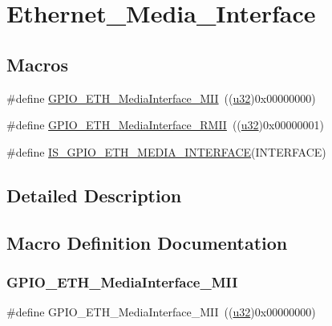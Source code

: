 \hypertarget{group___ethernet___media___interface}{}\section{Ethernet\+\_\+\+Media\+\_\+\+Interface}
\label{group___ethernet___media___interface}
\subsection*{Macros}
\begin{DoxyCompactItemize}
\item 
\#define \mbox{\hyperlink{group___ethernet___media___interface_gae11ff25c61c4f22f55118f9f88f6d465}{G\+P\+I\+O\+\_\+\+E\+T\+H\+\_\+\+Media\+Interface\+\_\+\+M\+II}}~((\mbox{\hyperlink{group___exported__types_gafaa62991928fb9fb18ff0db62a040aba}{u32}})0x00000000)
\item 
\#define \mbox{\hyperlink{group___ethernet___media___interface_ga5ee3d057ee58149b1d1abdacfacd4a4e}{G\+P\+I\+O\+\_\+\+E\+T\+H\+\_\+\+Media\+Interface\+\_\+\+R\+M\+II}}~((\mbox{\hyperlink{group___exported__types_gafaa62991928fb9fb18ff0db62a040aba}{u32}})0x00000001)
\item 
\#define \mbox{\hyperlink{group___ethernet___media___interface_gaaba662c046aed61cb28aa10918bfd4c4}{I\+S\+\_\+\+G\+P\+I\+O\+\_\+\+E\+T\+H\+\_\+\+M\+E\+D\+I\+A\+\_\+\+I\+N\+T\+E\+R\+F\+A\+CE}}(I\+N\+T\+E\+R\+F\+A\+CE)
\end{DoxyCompactItemize}


\subsection{Detailed Description}


\subsection{Macro Definition Documentation}
\mbox{\label{group___ethernet___media___interface_gae11ff25c61c4f22f55118f9f88f6d465}} 
\subsubsection{\texorpdfstring{GPIO\_ETH\_MediaInterface\_MII}{GPIO\_ETH\_MediaInterface\_MII}}
{\footnotesize\ttfamily \#define G\+P\+I\+O\+\_\+\+E\+T\+H\+\_\+\+Media\+Interface\+\_\+\+M\+II~((\mbox{\hyperlink{group___exported__types_gafaa62991928fb9fb18ff0db62a040aba}{u32}})0x00000000)}

